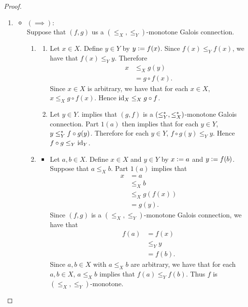 \documentclass{book}
\begin{document}
	\begin{proof}\
		\begin{enumerate}
			\item 
			\begin{itemize}
				\item $(\implies)$: \\
				Suppose that $(f,g)$ us a $(\leq_X, \leq_Y)$-monotone Galois connection.
				\begin{enumerate}
					\item 
					\begin{enumerate}
						\item Let $x \in X$. Define $y \in Y$ by $y \vcentcolon= f(x)$. Since $f(x) \leq_Y f(x)$, we have that $f(x) \leq_Y y$. Therefore 
						\begin{align*}
							x 
							& \leq_X g(y) \\
							& = g \circ f(x).
						\end{align*}
						Since $x \in X$ is arbitrary, we have that for each $x \in X$, $x \leq_X g \circ f(x)$. Hence $\operatorname{id}_X \leq_X g \circ f$.
						\item Let $y \in Y$. \tcr{the previous ex} implies that $(g,f)$ is a $(\leq^*_Y, \leq^*_X)$-monotone Galois connection. Part $1(a)$ then implies that for each $y \in Y$, $y \leq^*_Y f \circ g(y)$. Therefore for each $y \in Y$, $f \circ g(y) \leq_Y y$. Hence $f \circ g \leq_Y \operatorname{id}_Y$.
					\end{enumerate}
					\item 
					\begin{itemize}
						\item Let $a, b \in X$. Define $x \in X$ and $y \in Y$ by $x \vcentcolon= a$ and $y \vcentcolon= f(b)$. Suppose that $a \leq_X b$. Part $1(a)$ implies that 
						\begin{align*}
							x
							& = a \\
							& \leq_X b \\
							& \leq_X g(f(x)) \\
							& = g(y).
						\end{align*}
						Since $(f,g)$ is a $(\leq_X, \leq_Y)$-monotone Galois connection, we have that 
						\begin{align*}
							f(a)
							& = f(x) \\
							& \leq_Y y \\
							& = f(b).
						\end{align*}
						Since $a,b \in X$ with $a \leq_X b$ are arbitrary, we have that for each $a,b \in X$, $a \leq_X b$ implies that $f(a) \leq_Y f(b)$. Thus $f$ is $(\leq_X, \leq_Y)$-monotone.

\end{itemize}
\end{enumerate}
\end{itemize}
\end{enumerate}
\end{proof}
\end{document}
